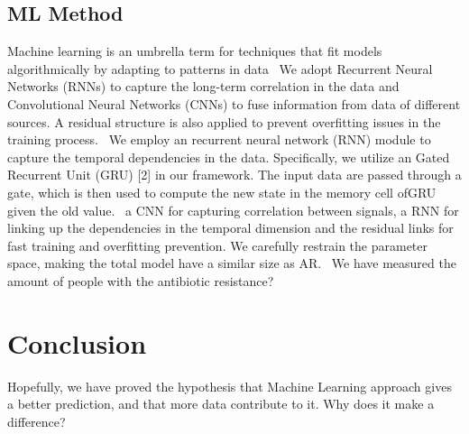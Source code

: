 \documentclass[12pt]{article}
\begin{document}
\subsection{ML Method}
Machine learning is an umbrella term for techniques that fit models algorithmically by adapting to patterns in data~\cite{Mooney.2018}
We adopt Recurrent Neural Networks (RNNs) to capture the long-term correlation in the data and Convolutional Neural Networks (CNNs) to fuse information from data of different sources. A residual structure is also applied to prevent overfitting issues in the training process.~\cite{Cho.03.06.2014b}
We employ an recurrent neural network (RNN) module to capture the temporal dependencies in the data. Specifically, we utilize an Gated Recurrent Unit (GRU) [2] in our framework. The input data are passed through a gate, which is then used to compute the new state in the memory cell ofGRU given the old value.~\cite{Cho.03.06.2014b}
a CNN for capturing correlation between signals, a RNN for linking up the dependencies in the temporal dimension and the residual links for fast training and overfitting prevention. We carefully restrain the parameter space, making the total model have a similar size as AR.~\cite{Cho.03.06.2014b}
We have measured the amount of people with the antibiotic resistance?

\section{Conclusion}
Hopefully, we have proved the hypothesis that Machine Learning approach gives a better prediction, and that more data contribute to it. 
Why does it make a difference?


\end{document}
